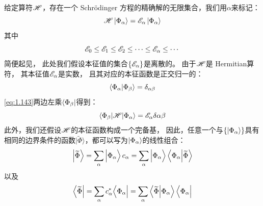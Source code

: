 给定算符$\mathscr{H}$，存在一个 Schr\"odinger 方程的精确解的无限集合，我们用$\alpha$来标记：
\begin{equation}
 \mathscr{H}\Ket{\Phi_\alpha} = \mathscr{E}_\alpha\Ket{\Phi_\alpha}
 \label{eq:1.143}
\end{equation}
其中
\[
\mathscr{E}_0 \leq \mathscr{E}_1 \leq \mathscr{E}_2 \leq \cdots \leq \mathscr{E}_\alpha \leq \cdots
\]
简便起见，
此处我们假设本征值的集合$\left\{\mathscr{E}_\alpha\right\}$是离散的。
由于$\mathscr{H}$是 Hermitian算符，
其本征值$\mathscr{E}_\alpha$是实数，
且其对应的本征函数是正交归一的：
\begin{equation}
 \langle \Phi_\alpha \vert \Phi_\beta \rangle = \delta_{\alpha\beta}
 \label{eq:1.144}
\end{equation}
\autoref{eq:1.143}两边左乘$\Bra{\Phi_\beta}$得到：
\begin{equation}
 \left\langle \Phi_\beta\middle\vert \mathscr{H} \middle\vert \Phi_\alpha\right\rangle = \mathscr{E}_\alpha\delta{\alpha\beta}
 \label{eq:1.145}
\end{equation}
此外，我们还假设$\mathscr{H}$的本征函数构成一个完备基，
因此，任意一个与$\left\{\Ket{\Phi_\alpha}\right\}$具有相同的边界条件的函数$\vert\widetilde{\Phi}\rangle$，都可以写为$\Ket{\Phi_\alpha}$的线性组合：
\begin{equation}
 \Ket{\widetilde{\Phi}} = \sum_\alpha \mathinner{\Big\vert\Phi_\alpha\Big\rangle} c_\alpha = \sum_\alpha \Big\vert\Phi_\alpha\Big\rangle \left\langle \Phi_\alpha \middle\vert \widetilde{\Phi} \right\rangle
 \label{eq:1.146}
\end{equation}
以及
\begin{equation}
 \Bra{\widetilde\Phi} = \sum_\alpha c_\alpha^\ast \Big\langle\Phi_\alpha\Big\vert = \sum_\alpha \left\langle \widetilde\Phi \middle\vert \Phi_\alpha \right\rangle\Big\langle\Phi_\alpha\Big\vert
 \label{eq:1.147}
\end{equation}

